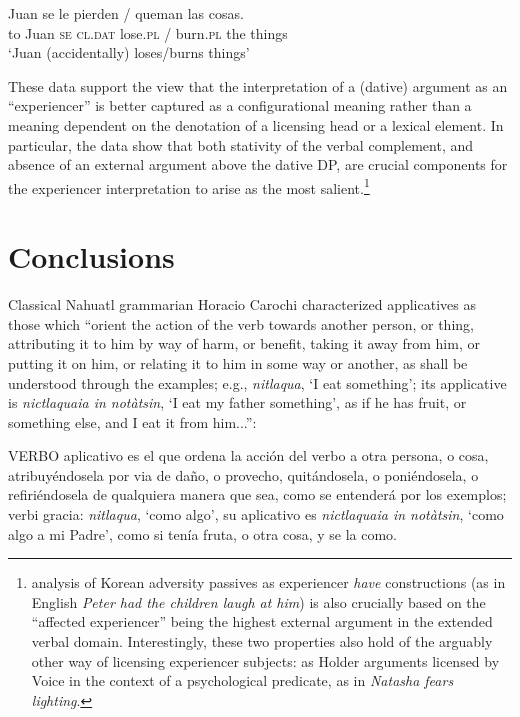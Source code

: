 \documentclass[output=paper,colorlinks,citecolor=brown,nonflat]{./langscibook}
\begin{document}
\ea%
    \label{ex:cuervo:22}
     {Juan} {se} {le} {pierden} / {queman} {las} {cosas}.\\
    {to} Juan \textsc{se} \textsc{cl.dat}   lose.\textsc{pl} / burn.\textsc{pl}  the things\\
    \glt ‘Juan (accidentally) loses/burns things’
    \z

These data support the view that the interpretation of a (dative) argument as an “experiencer” is better captured as a configurational meaning rather than a meaning dependent on the denotation of a licensing head or a lexical element. In particular, the data show that both stativity of the verbal complement, and absence of an external argument above the dative DP, are crucial components for the experiencer interpretation to arise as the most salient.\footnote{ analysis of Korean adversity passives as experiencer \textit{have} constructions (as in English \textit{Peter had the children laugh at him}) is also crucially based on the “affected experiencer” being the highest external argument in the extended verbal domain. Interestingly, these two properties also hold of the arguably other way of licensing experiencer subjects: as Holder arguments licensed by Voice in the context of a psychological predicate, as in \textit{Natasha fears lighting}.} 

\section{Conclusions}\label{sec:cuervo:5}

Classical Nahuatl grammarian Horacio Carochi characterized applicatives as those which “orient the action of the verb towards another person, or thing, attributing it to him by way of harm, or benefit, taking it away from him, or putting it on him, or relating it to him in some way or another, as shall be understood through the examples; e.g., \textit{nitlaqua}, ‘I eat something’; its applicative is \textit{nictlaquaia in notàtsin}, ‘I eat my father something’, as if he has fruit, or something else, and I eat it from him...”: 

VERBO aplicativo es el que ordena la acción del verbo a otra persona, o cosa, atribuyéndosela por via de daño, o provecho, quitándosela, o poniéndosela, o refiriéndosela de qualquiera manera que sea, como se entenderá por los exemplos; verbi gracia: \textit{nitlaqua}, ‘como algo’, su aplicativo es \textit{nictlaquaia in notàtsin}, ‘como algo a mi Padre’, como si tenía fruta, o otra cosa, y se la como. \citep[466]{Carochi1645}
\end{document}

